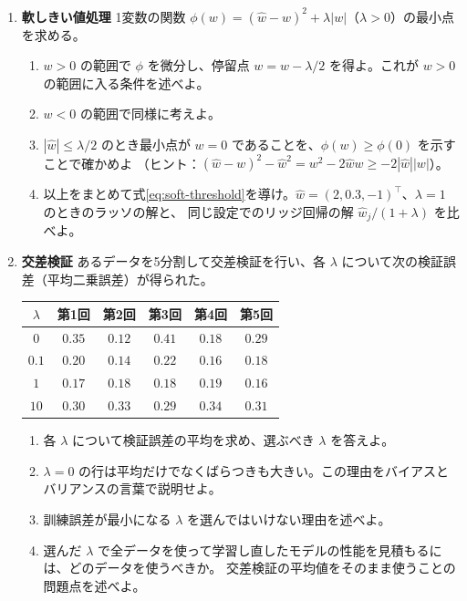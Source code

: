 \begin{enumerate}
  \item \textbf{軟しきい値処理}\quad
    1変数の関数 $\phi(w) = (\hat{w} - w)^2 + \lambda|w|$（$\lambda > 0$）の最小点を求める。
    \begin{enumerate}
      \item $w > 0$ の範囲で $\phi$ を微分し、停留点 $w = \hat{w} - \lambda/2$ を得よ。これが $w > 0$ の範囲に入る条件を述べよ。
      \item $w < 0$ の範囲で同様に考えよ。
      \item $|\hat{w}| \leq \lambda/2$ のとき最小点が $w = 0$ であることを、$\phi(w) \geq \phi(0)$ を示すことで確かめよ
        （ヒント：$(\hat{w} - w)^2 - \hat{w}^2 = w^2 - 2\hat{w}w \geq -2|\hat{w}||w|$）。
      \item 以上をまとめて式\eqref{eq:soft-threshold}を導け。$\hat{w} = (2, 0.3, -1)^\top$、$\lambda = 1$ のときのラッソの解と、
        同じ設定でのリッジ回帰の解 $\hat{w}_j/(1 + \lambda)$ を比べよ。
    \end{enumerate}

  \item \textbf{交差検証}\quad
    あるデータを5分割して交差検証を行い、各 $\lambda$ について次の検証誤差（平均二乗誤差）が得られた。
    \begin{center}
      \begin{tabular}{c|ccccc}
        \hline
        $\lambda$ & 第1回 & 第2回 & 第3回 & 第4回 & 第5回 \\
        \hline\hline
        $0$ & $0.35$ & $0.12$ & $0.41$ & $0.18$ & $0.29$ \\
        $0.1$ & $0.20$ & $0.14$ & $0.22$ & $0.16$ & $0.18$ \\
        $1$ & $0.17$ & $0.18$ & $0.18$ & $0.19$ & $0.16$ \\
        $10$ & $0.30$ & $0.33$ & $0.29$ & $0.34$ & $0.31$ \\
        \hline
      \end{tabular}
    \end{center}
    \begin{enumerate}
      \item 各 $\lambda$ について検証誤差の平均を求め、選ぶべき $\lambda$ を答えよ。
      \item $\lambda = 0$ の行は平均だけでなくばらつきも大きい。この理由をバイアスとバリアンスの言葉で説明せよ。
      \item 訓練誤差が最小になる $\lambda$ を選んではいけない理由を述べよ。
      \item 選んだ $\lambda$ で全データを使って学習し直したモデルの性能を見積もるには、どのデータを使うべきか。
        交差検証の平均値をそのまま使うことの問題点を述べよ。
    \end{enumerate}

\end{enumerate}



